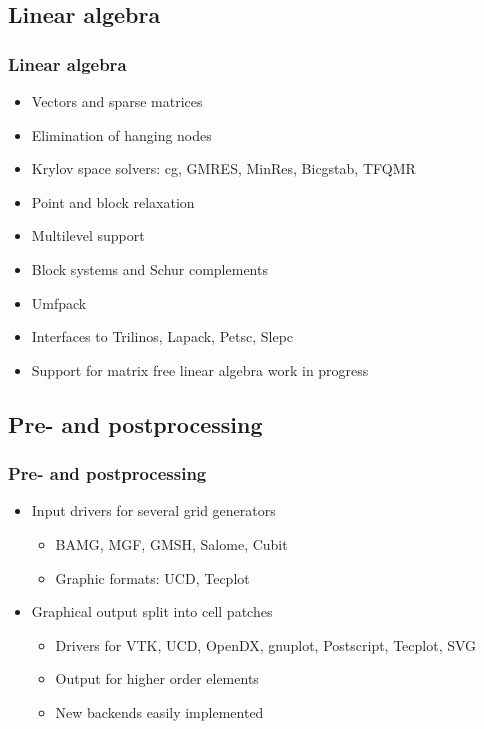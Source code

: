 \subsection{Linear algebra}
\begin{frame}
  \frametitle{Linear algebra}
  \begin{itemize}
  \item Vectors and sparse matrices
  \item Elimination of hanging nodes
  \item Krylov space solvers: cg, GMRES, MinRes, Bicgstab, TFQMR
  \item Point and block relaxation
    \pause
  \item Multilevel support
  \item Block systems and Schur complements
    \pause
  \item Umfpack
  \item Interfaces to Trilinos, Lapack, Petsc, Slepc
    \pause
  \item Support for matrix free linear algebra work in progress
  \end{itemize}
\end{frame}

\subsection{Pre- and postprocessing}
\begin{frame}
  \frametitle{Pre- and postprocessing}
  \begin{itemize}
  \item<+-> Input drivers for several grid generators
    \begin{itemize}
    \item BAMG, MGF, GMSH, Salome, Cubit
    \item Graphic formats: UCD, Tecplot
    \end{itemize}
  \item<+-> Graphical output split into cell patches
    \begin{itemize}
    \item Drivers for VTK, UCD, OpenDX, gnuplot, Postscript, Tecplot, SVG
    \item Output for higher order elements
    \item New backends easily implemented
    \end{itemize}
  \end{itemize}
\end{frame}

